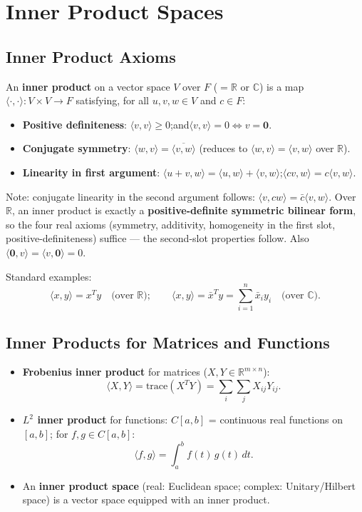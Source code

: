 \documentclass[hidelinks]{article}
\begin{document}
\section{Inner Product Spaces}

\subsection{Inner Product Axioms}
An \textbf{inner product} on a vector space $V$ over $F$ ($= \mathbb{R}$ or $\mathbb{C}$) is a map $\langle\cdot,\cdot\rangle: V\times V \rightarrow F$ satisfying, for all $u, v, w\in V$ and $c\in F$:
\begin{itemize}
    \item \textbf{Positive definiteness}: $\langle v,v\rangle \geq 0$;\quad and\quad $\langle v,v\rangle = 0 \iff v = \mathbf{0}$.
    \item \textbf{Conjugate symmetry}: $\langle w,v\rangle = \overline{\langle v,w\rangle}$ \quad (reduces to $\langle w,v\rangle=\langle v,w\rangle$ over $\mathbb{R}$).
    \item \textbf{Linearity in first argument}: $\langle u+v,w\rangle = \langle u,w\rangle + \langle v,w\rangle$;\quad $\langle cv,w\rangle = c\langle v,w\rangle$.
\end{itemize}
Note: conjugate linearity in the second argument follows: $\langle v, cw\rangle = \bar{c}\langle v,w\rangle$. Over $\mathbb{R}$, an inner product is exactly a \textbf{positive-definite symmetric bilinear form}, so the four real axioms (symmetry, additivity, homogeneity in the first slot, positive-definiteness) suffice — the second-slot properties follow. Also $\langle \mathbf 0, v\rangle = \langle v, \mathbf 0\rangle = 0$.

Standard examples:
\[
    \langle x,y\rangle = x^T y \quad \text{(over } \mathbb{R}\text{)}; \qquad
    \langle x,y\rangle = \bar{x}^T y = \sum_{i=1}^n \bar{x}_i y_i \quad \text{(over } \mathbb{C}\text{)}.
\]

\subsection{Inner Products for Matrices and Functions}
\begin{itemize}
    \item \textbf{Frobenius inner product} for matrices ($X,Y\in\mathbb{R}^{m\times n}$):
    \[
        \langle X,Y\rangle = \mathrm{trace}(X^T Y) = \sum_i\sum_j X_{ij}Y_{ij}.
    \]
    \item \textbf{$L^2$ inner product} for functions: $C[a,b]$ = continuous real functions on $[a,b]$; for $f,g\in C[a,b]$:
    \[
        \langle f,g\rangle = \int_a^b f(t)\,g(t)\,dt.
    \]
    \item An \textbf{inner product space} (real: Euclidean space; complex: Unitary/Hilbert space) is a vector space equipped with an inner product.
\end{itemize}
\end{document}
